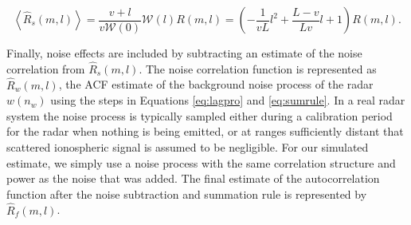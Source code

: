 \begin{equation}
\label{eq:sumruleest}
\left\langle\widehat{R}_s(m,l) \right\rangle  =\frac{v+l}{v\mathcal{W}(0)}\mathcal{W}(l)R(m,l) =\left(-\frac{1}{vL}l^2+\frac{L-v}{Lv}l+1\right)   R(m,l).
\end{equation}





Finally, noise effects are included by subtracting an estimate of the noise correlation from $\widehat{R}_s(m,l)$.  The noise correlation function is represented as $\widehat{R}_w(m,l)$, the ACF estimate of the background noise process of the radar $w(n_w)$ using the steps in Equations \ref{eq:lagpro} and \ref{eq:sumrule}. In a real radar system the noise process is typically sampled either during a calibration period for the radar when nothing is being emitted, or at ranges sufficiently distant that scattered ionospheric signal is assumed to be negligible. For our simulated estimate, we simply use a noise process with the same correlation structure and power as the noise that was added. The final estimate of the autocorrelation function after the noise subtraction and summation rule is represented by $\widehat{R}_f(m,l)$.


